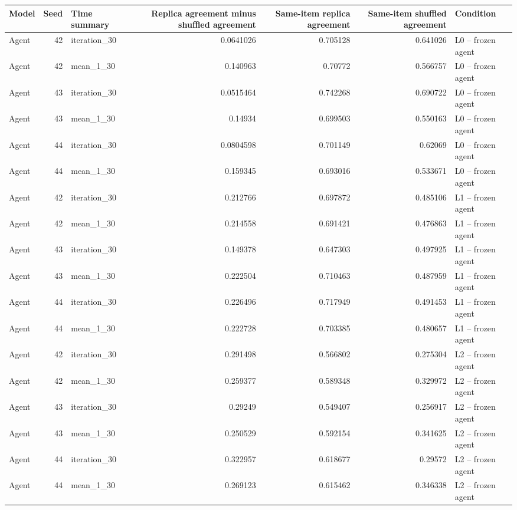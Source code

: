 \begin{table}[htbp!]
\centering
\small
\setlength{\tabcolsep}{3pt}
\renewcommand{\arraystretch}{1.1}
\begin{tabular}{lrlrrrl}
\hline
Model & Seed & Time summary & Replica agreement minus shuffled agreement & Same-item replica agreement & Same-item shuffled agreement & Condition \\
\hline
Agent & 42 & iteration\_30 & 0.0641026 & 0.705128 & 0.641026 & L0 -- frozen agent \\
Agent & 42 & mean\_1\_30 & 0.140963 & 0.70772 & 0.566757 & L0 -- frozen agent \\
Agent & 43 & iteration\_30 & 0.0515464 & 0.742268 & 0.690722 & L0 -- frozen agent \\
Agent & 43 & mean\_1\_30 & 0.14934 & 0.699503 & 0.550163 & L0 -- frozen agent \\
Agent & 44 & iteration\_30 & 0.0804598 & 0.701149 & 0.62069 & L0 -- frozen agent \\
Agent & 44 & mean\_1\_30 & 0.159345 & 0.693016 & 0.533671 & L0 -- frozen agent \\
Agent & 42 & iteration\_30 & 0.212766 & 0.697872 & 0.485106 & L1 -- frozen agent \\
Agent & 42 & mean\_1\_30 & 0.214558 & 0.691421 & 0.476863 & L1 -- frozen agent \\
Agent & 43 & iteration\_30 & 0.149378 & 0.647303 & 0.497925 & L1 -- frozen agent \\
Agent & 43 & mean\_1\_30 & 0.222504 & 0.710463 & 0.487959 & L1 -- frozen agent \\
Agent & 44 & iteration\_30 & 0.226496 & 0.717949 & 0.491453 & L1 -- frozen agent \\
Agent & 44 & mean\_1\_30 & 0.222728 & 0.703385 & 0.480657 & L1 -- frozen agent \\
Agent & 42 & iteration\_30 & 0.291498 & 0.566802 & 0.275304 & L2 -- frozen agent \\
Agent & 42 & mean\_1\_30 & 0.259377 & 0.589348 & 0.329972 & L2 -- frozen agent \\
Agent & 43 & iteration\_30 & 0.29249 & 0.549407 & 0.256917 & L2 -- frozen agent \\
Agent & 43 & mean\_1\_30 & 0.250529 & 0.592154 & 0.341625 & L2 -- frozen agent \\
Agent & 44 & iteration\_30 & 0.322957 & 0.618677 & 0.29572 & L2 -- frozen agent \\
Agent & 44 & mean\_1\_30 & 0.269123 & 0.615462 & 0.346338 & L2 -- frozen agent \\

\end{tabular}
\end{table}
